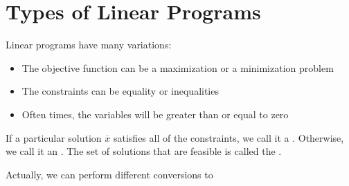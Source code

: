 \documentclass[11pt]{article}
\begin{document}
\vfill
\newpage

%
%
%

\section{Types of Linear Programs}
Linear programs have many variations:
\begin{itemize}
	\item The objective function can be a maximization or a minimization problem
	\item The constraints can be equality or inequalities
	\item Often times, the variables will be greater than or equal to zero
\end{itemize}

If a particular solution $\overline{x}$ satisfies all of the constraints, we call it a . 
Otherwise, we call it an .
The set of solutions that are feasible is called the .

Actually, we can perform different conversions to
\end{document}
